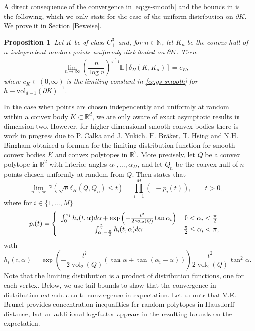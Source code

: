\documentclass[a4paper,12pt]{article}
\newtheorem{proposition}{Proposition}
\theoremstyle{definition}
\newcommand{\IE}{\mathbb{E}}
\newcommand{\IN}{\mathbb{N}}
\newcommand{\IR}{\mathbb{R}}
\newcommand{\dd}{{\rm d}}
\newcommand{\vol}{\mathrm{vol}}
\begin{document}
A direct consequence of the convergence in \eqref{eq:gs-smooth} and the bounds in \cite{DW96} is the following, 
which we only state for the case of the uniform distribution on $\partial K$. We prove it in Section \ref{Beweise}.

 \begin{proposition}\label{pro:smooth}
Let $K$ be of class $C^3_+$ and, for $n\in\IN$, let $K_n$ be the convex hull of $n$ independent random points uniformly distributed on $\partial K$. Then
\[
\lim_{n\to\infty}\left(\frac{n}{\log n}\right)^{\frac{2}{d-1}}\IE[ \delta_{H}(K,K_{n})]
= c_K,
\]
where $c_K\in(0,\infty)$ is the limiting constant in \eqref{eq:gs-smooth} for $h\equiv \vol_{d-1}(\partial K)^{-1}$.
\end{proposition}

In the case when  points are chosen independently and uniformly at random within a convex body $K\subset \IR^d$, we are only aware of exact asymptotic results in dimension two. However, for higher-dimensional smooth convex bodies there is  work in progress due to P. Calka and J. Yukich. H. Br\"aker, T. Hsing and N.H. Bingham \cite{BHB98} obtained a formula for the limiting distribution function for smooth convex bodies $K$ and convex polytopes in $\mathbb R^{2}$. More precisely, let $Q$ be a convex polytope in $\mathbb R^{2}$ with interior angles $\alpha_{1},\dots,\alpha_{M}$, and let $Q_{n}$ be the convex hull of $n$ points chosen uniformly at random from $Q$. Then \cite[Thm. 3]{BHB98} states that
$$
\lim_{n\to\infty}\mathbb P(\sqrt{n}\delta_{H}(Q,Q_{n})\leq t)
=\prod_{i=1}^{M}(1-p_{i}(t)),\qquad t> 0,
$$
where for $i\in\{1,\dots,M\}$
\begin{equation}
 \label{eq:bhb-integral}
p_{i}(t)
=\left\{
\begin{array}{cc}
\int_{0}^{\alpha_{i}}h_{i}(t,\alpha)\dd\alpha+\exp\left(-\frac{t^{2}}{2\operatorname{vol}_{2}(Q)}\tan\alpha_{i}\right) 
& 0<\alpha_{i}<\frac{\pi}{2}
\\
\int_{\alpha_{i}-\frac{\pi}{2}}^{\frac{\pi}{2}}h_{i}(t,\alpha)\dd\alpha
& \frac{\pi}{2}\leq \alpha_{i}<\pi,
\end{array}
\right.
\end{equation}
with
$$
h_{i}(t,\alpha)
=\exp\left(-\frac{t^{2}}{2\operatorname{vol}_{2}(Q)}\left(\tan\alpha+\tan(\alpha_{i}-\alpha)\right)\right)
\frac{t^{2}}{2\operatorname{vol}_{2}(Q)}\tan^{2}\alpha.
$$
Note that the limiting distribution is a product of distribution functions, one for each vertex. Below, we use tail bounds to show that the convergence in distribution extends also to convergence in expectation. Let us note that V.E. Brunel \cite{Bru19} provides concentration inequalities for random polytopes in Hausdorff distance, but an additional log-factor appears in the resulting bounds on the expectation.
\end{document}
